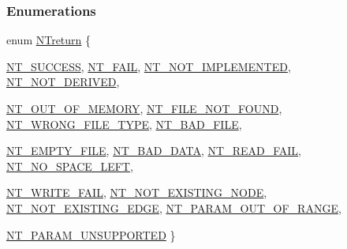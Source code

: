 \subsubsection*{Enumerations}
\begin{DoxyCompactItemize}
\item 
enum \hyperlink{nt__types_8h_ab9564ee8f091e809d21b8451c6683c53}{NTreturn} \{ \par
\hyperlink{nt__types_8h_ab9564ee8f091e809d21b8451c6683c53a5122d5d816d4ae16c6372dddea3cb8f3}{NT\_\-SUCCESS}, 
\hyperlink{nt__types_8h_ab9564ee8f091e809d21b8451c6683c53a005140cfd1c4c204ea31eb24e36093cc}{NT\_\-FAIL}, 
\hyperlink{nt__types_8h_ab9564ee8f091e809d21b8451c6683c53a358d0970715d8ee6d8fed2c9ed7c135d}{NT\_\-NOT\_\-IMPLEMENTED}, 
\hyperlink{nt__types_8h_ab9564ee8f091e809d21b8451c6683c53affb361a1abe2770f234c6ff02615bdb6}{NT\_\-NOT\_\-DERIVED}, 
\par
\hyperlink{nt__types_8h_ab9564ee8f091e809d21b8451c6683c53a44497433be8510a7e093fa24da916460}{NT\_\-OUT\_\-OF\_\-MEMORY}, 
\hyperlink{nt__types_8h_ab9564ee8f091e809d21b8451c6683c53ae880c6cfc98e59916b4ef0d3aa410491}{NT\_\-FILE\_\-NOT\_\-FOUND}, 
\hyperlink{nt__types_8h_ab9564ee8f091e809d21b8451c6683c53aaa19a7cf5c29a35d6470e09eba63d2d5}{NT\_\-WRONG\_\-FILE\_\-TYPE}, 
\hyperlink{nt__types_8h_ab9564ee8f091e809d21b8451c6683c53a7a6c0a109d3edc1ad4192a3229670b68}{NT\_\-BAD\_\-FILE}, 
\par
\hyperlink{nt__types_8h_ab9564ee8f091e809d21b8451c6683c53a2b7ee47bebe1667e378a622631c93972}{NT\_\-EMPTY\_\-FILE}, 
\hyperlink{nt__types_8h_ab9564ee8f091e809d21b8451c6683c53a3a4aad36d36d4c28303bc3d91c8b607c}{NT\_\-BAD\_\-DATA}, 
\hyperlink{nt__types_8h_ab9564ee8f091e809d21b8451c6683c53abe0ba00d1122ce390af46f531e14a6df}{NT\_\-READ\_\-FAIL}, 
\hyperlink{nt__types_8h_ab9564ee8f091e809d21b8451c6683c53a09e38bbedeb9a39817826fa63ac15074}{NT\_\-NO\_\-SPACE\_\-LEFT}, 
\par
\hyperlink{nt__types_8h_ab9564ee8f091e809d21b8451c6683c53a498a0e284fbf6129965401ef4adfa977}{NT\_\-WRITE\_\-FAIL}, 
\hyperlink{nt__types_8h_ab9564ee8f091e809d21b8451c6683c53a26c6165dbced8c5ef75255f5a27ae91d}{NT\_\-NOT\_\-EXISTING\_\-NODE}, 
\hyperlink{nt__types_8h_ab9564ee8f091e809d21b8451c6683c53a9ebeeb0b946e24badf81c9f55ba92b04}{NT\_\-NOT\_\-EXISTING\_\-EDGE}, 
\hyperlink{nt__types_8h_ab9564ee8f091e809d21b8451c6683c53a551827d8c803386774c9a4390d764370}{NT\_\-PARAM\_\-OUT\_\-OF\_\-RANGE}, 
\par
\hyperlink{nt__types_8h_ab9564ee8f091e809d21b8451c6683c53af8fc8207dcd1011f3be8b3e03a75c161}{NT\_\-PARAM\_\-UNSUPPORTED}
 \}
\end{DoxyCompactItemize}
